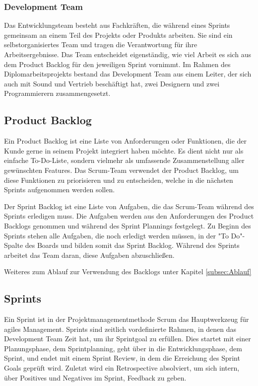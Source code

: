 \subsubsection{Development Team}\label{subsubsec:Development-Team}
%
Das Entwicklungsteam besteht aus Fachkräften, die während eines Sprints gemeinsam an einem Teil des Projekts oder Produkts arbeiten.
Sie sind ein selbstorganisiertes Team und tragen die Verantwortung für ihre Arbeitsergebnisse.
Das Team entscheidet eigenständig, wie viel Arbeit es sich aus dem Product Backlog für den jeweiligen Sprint vornimmt.
Im Rahmen des Diplomarbeitsprojekts bestand das Development Team aus einem Leiter, der sich auch mit Sound und Vertrieb beschäftigt hat, zwei Designern und zwei Programmierern zusammengesetzt.
%
\subsection{Product Backlog}\label{subsec:product-backlog}
%
Ein Product Backlog ist eine Liste von Anforderungen oder Funktionen, die der Kunde gerne in seinem Projekt integriert haben möchte.
Es dient nicht nur als einfache To-Do-Liste, sondern vielmehr als umfassende Zusammenstellung aller gewünschten Features.
Das Scrum-Team verwendet der Product Backlog, um diese Funktionen zu priorisieren und zu entscheiden, welche in die nächsten Sprints aufgenommen werden sollen.

Der Sprint Backlog ist eine Liste von Aufgaben, die das Scrum-Team während des Sprints erledigen muss.
Die Aufgaben werden aus den Anforderungen des Product Backlogs genommen und während des Sprint Plannings festgelegt.
Zu Beginn des Sprints stehen alle Aufgaben, die noch erledigt werden müssen, in der "To Do"-Spalte des Boards und bilden somit das Sprint Backlog.
Während des Sprints arbeitet das Team daran, diese Aufgaben abzuschließen.

Weiteres zum Ablauf zur Verwendung des Backlogs unter Kapitel \ref{subsec:Ablauf}
%

\subsection{Sprints}\label{subsec:sprints}
%
Ein Sprint ist in der Projektmanagementmethode Scrum das Hauptwerkzeug für agiles Management.
Sprints sind zeitlich vordefinierte Rahmen, in denen das Development Team Zeit hat, um ihr Sprintgoal zu erfüllen.
Dies startet mit einer Planungsphase, dem Sprintplanning, geht über in die Entwicklungsphase, dem Sprint, und endet mit einem Sprint Review, in dem die Erreichung des Sprint Goals geprüft wird.
Zuletzt wird ein Retrospective absolviert, um sich intern, über Positives und Negatives im Sprint, Feedback zu geben. 
%
